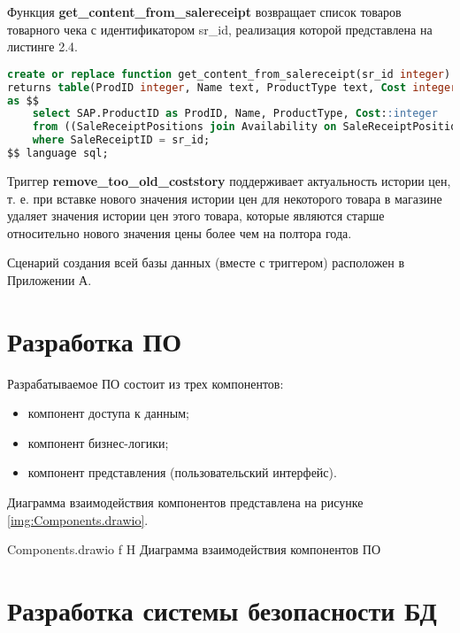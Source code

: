 \documentclass{bmstu}
\begin{document}
Функция \textbf{get\_content\_from\_salereceipt} возвращает список товаров товарного чека с идентификатором sr\_id, реализация которой представлена на листинге 2.4.

\begin{lstlisting}[language=sql, caption={Реализация хранимой функции get\_content\_from\_salereceipt}]
create or replace function get_content_from_salereceipt(sr_id integer)
returns table(ProdID integer, Name text, ProductType text, Cost integer)
as $$
	select SAP.ProductID as ProdID, Name, ProductType, Cost::integer
	from ((SaleReceiptPositions join Availability on SaleReceiptPositions.AvailabilityID = Availability.ID) as SA join Products on Products.ID = SA.ProductID) as SAP join Costs on SAP.AvailabilityID = Costs.AvailabilityID
	where SaleReceiptID = sr_id;
$$ language sql;
\end{lstlisting} 

Триггер \textbf{remove\_too\_old\_coststory} поддерживает актуальность истории цен, т. е. при вставке нового значения истории цен для некоторого товара в магазине удаляет значения истории цен этого товара, которые являются старше относительно нового значения цены более чем на полтора года.

Сценарий создания всей базы данных (вместе с триггером) расположен в Приложении А.

\section{Разработка ПО}

Разрабатываемое ПО состоит из трех компонентов:

\begin{itemize}
	\item компонент доступа к данным;
	\item компонент бизнес-логики;
	\item компонент представления (пользовательский интерфейс).
\end{itemize}

Диаграмма взаимодействия компонентов представлена на рисунке \ref{img:Components.drawio}.

	{Components.drawio}
	{f}
	{H}
	{\textwidth}
	{Диаграмма взаимодействия компонентов ПО}

\section{Разработка системы безопасности БД}
\end{document}
